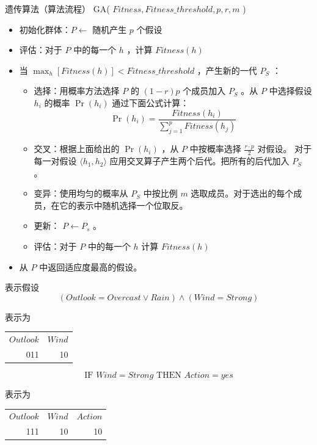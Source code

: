 \documentclass[presentation]{beamer}
\begin{document}
\begin{frame}[label={sec:orgefa49c2}]{遗传算法（算法流程）}
GA( \(Fitness, Fitness\_threshold, p, r, m\) )
\begin{itemize}
\item 初始化群体：\(P \leftarrow\)  随机产生 \(p\) 个假设
\item 评估：对于 \(P\) 中的每一个 \(h\) ，计算 \(Fitness(h)\)
\item 当 \({\displaystyle \max_{h}[Fitness(h)]} < Fitness\_threshold\) ，产生新的一代 \(P_S\) ：
\begin{itemize}
\item 选择：用概率方法选择 \(P\) 的 \((1-r)p\) 个成员加入 \(P_S\) 。从 \(P\) 中选择假设 \(h_i\) 的概率 \(\Pr(h_i)\) 通过下面公式计算：
$$\Pr(h_{i}) = \frac{Fitness(h_{i})}{\sum_{j=1}^{p} Fitness(h_{j})}$$
\item 交叉：根据上面给出的 \(\Pr(h_i)\) ，从 \(P\) 中按概率选择 \(\frac{r \cdot p}{2}\) 对假设。
对于每一对假设 \(\langle h_{1}, h_{2} \rangle\) 应用交叉算子产生两个后代。把所有的后代加入 \(P_S\) 。
\item 变异：使用均匀的概率从 \(P_S\) 中按比例 \(m\) 选取成员。对于选出的每个成员，在它的表示中随机选择一个位取反。
\item 更新： \(P \leftarrow P_{s}\) 。
\item 评估：对于 \(P\) 中的每一个 \(h\) 计算 \(Fitness(h)\)
\end{itemize}
\item 从 \(P\) 中返回适应度最高的假设。
\end{itemize}
\end{frame}
\begin{frame}[label={sec:org3a2d3a3}]{表示假设}
$$(Outlook = Overcast \lor Rain) \land (Wind = Strong)$$

表示为

\begin{center}
\begin{tabular}{rr}
\(Outlook\) & \(Wind\)\\
011 & 10\\
\end{tabular}
\end{center}


$$\mbox{IF\ \ } Wind = Strong \mbox{\ \ \ THEN\ \ } Action=yes$$

表示为


\begin{center}
\begin{tabular}{rrr}
\(Outlook\) & \(Wind\) & \(Action\)\\
111 & 10 & 10\\
\end{tabular}
\end{center}
\end{frame}
\end{document}
